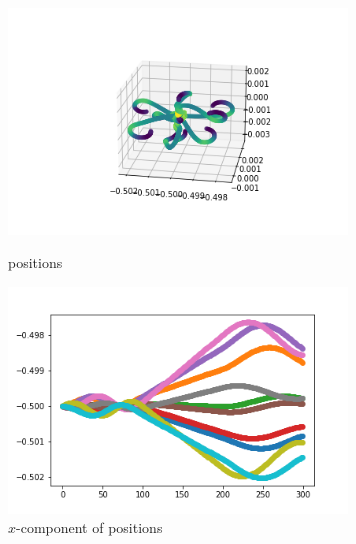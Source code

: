 \documentclass[12pt]{article}
\begin{document}
	\begin{figure}[H]
		\begin{multicols}{2}
			\includegraphics[width=\linewidth, height=6cm]{multips2.png} \caption{positions} \label{multips2} \par
			\includegraphics[width=\linewidth, height=6cm]{multipsx2.png} \caption{$x$-component of positions} \label{multipsx2} \par
		\end{multicols}
	\end{figure}
\end{document}

